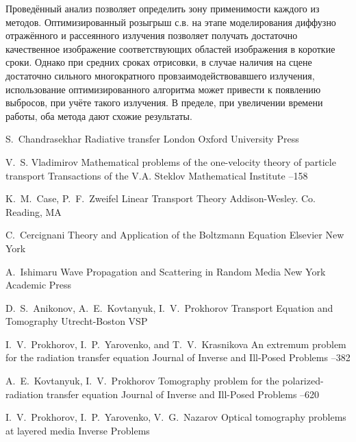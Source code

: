 \documentclass[12pt,reqno]{report}
\begin{document}
{Проведённый анализ позволяет определить зону применимости каждого из методов.
Оптимизированный розыгрыш с.в. на этапе моделирования диффузно отражённого и рассеянного излучения
позволяет получать достаточно качественное изображение соответствующих областей изображения
в короткие сроки. Однако при средних сроках отрисовки, в случае наличия
на сцене достаточно сильного многократного провзаимодействовавшего излучения, использование
оптимизированного алгоритма может привести к появлению выбросов, при учёте такого излучения.
В пределе, при увеличении времени работы, оба метода дают схожие результаты.





\begin{thebibliography}{1}

 \by  S.~Chandrasekhar \book  Radiative transfer \publaddr London \publ Oxford University Press 

 \by V.~S. Vladimirov  \paper Mathematical problems of the one-velocity theory of particle transport \jour  Transactions of the V.A. Steklov Mathematical Institute  
 --158


 \by K.~M.~Case, P.~F.~Zweifel \book Linear Transport Theory \publ 
Addison-Wesley. Co. Reading, MA 


 \by C.~Cercignani \book Theory and Application of the Boltzmann Equation \publ Elsevier \publaddr New York 

 \by  A.~Ishimaru \book  Wave Propagation and Scattering in 	Random Media \publaddr  New York \publ Academic Press 

 \by    D.~S.~Anikonov,   A.~E.~Kovtanyuk,    I.~V.~Prokhorov \book Transport
	Equation and Tomography \publaddr Utrecht-Boston \publ  VSP 

 \by   I.~V.~Prokhorov,   I.~P.~Yarovenko, and T.~V.~Krasnikova \paper An extremum problem for the radiation transfer
equation \jour Journal of Inverse and Ill-Posed Problems 
  --382

 \by A.~E.~Kovtanyuk, I.~V.~Prokhorov \paper Tomography problem for
the polarized-radiation transfer equation \jour  Journal of Inverse and Ill-Posed Problems    --620


\by I.~V.~Prokhorov, I.~P.~Yarovenko, V.~G.~Nazarov
\paper Optical tomography problems at layered media
\jour Inverse Problems


\end{thebibliography}}
\end{document}
